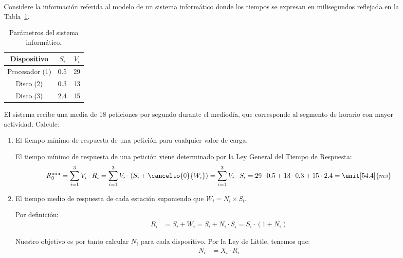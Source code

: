 \begin{ejercicio}\label{ej:5.14}
    Considere la información referida al modelo de un sistema informático donde los tiempos se expresan en milisegundos reflejada en la Tabla~\ref{tab:5.14}.
    \begin{table}[h]
        \centering
        \begin{tabular}{|c|c|c|}
            \hline
            Dispositivo & $S_i$ & $V_i$ \\
            \hline
            Procesador (1) & 0.5 & 29 \\
            Disco (2) & 0.3 & 13 \\
            Disco (3) & 2.4 & 15 \\
            \hline
        \end{tabular}
        \caption{Parámetros del sistema informático.}
        \label{tab:5.14}
    \end{table}
    El sistema recibe una media de 18 peticiones por segundo durante el mediodía, que corresponde al segmento de horario con mayor actividad. Calcule:
    \begin{enumerate}
        \item El tiempo mínimo de respuesta de una petición para cualquier valor de carga.
        
        El tiempo mínimo de respuesta de una petición viene determinado por la Ley General del Tiempo de Respuesta:
        \begin{equation*}
            R_0^{\text{min}} = \sum_{i=1}^{3} V_i \cdot R_i = \sum_{i=1}^{3} V_i \cdot (S_i + \cancelto{0}{W_i}) = \sum_{i=1}^{3} V_i \cdot S_i = 29 \cdot 0.5 + 13 \cdot 0.3 + 15 \cdot 2.4 = \unit[54.4]{ms}
        \end{equation*}


        \item El tiempo medio de respuesta de cada estación suponiendo que $W_i = N_i \times S_i$.
        
        Por definición:
        \begin{align*}
            R_i &= S_i + W_i = S_i + N_i \cdot S_i = S_i \cdot (1 + N_i)
        \end{align*}

        Nuestro objetivo es por tanto calcular $N_i$ para cada dispositivo. Por la Ley de Little, tenemos que:
        \begin{align*}
            N_i &= X_i \cdot R_i
        \end{align*}


\end{enumerate}
\end{ejercicio}
